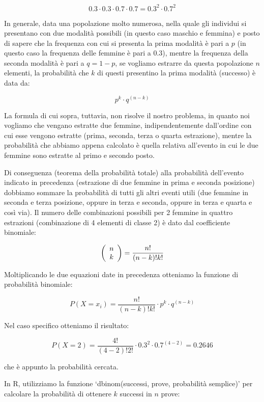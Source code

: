 \documentclass[a4paper,12pt,oneside]{book}
\theoremstyle{definition}
\theoremstyle{definition}
\theoremstyle{definition}
\theoremstyle{remark}
\begin{document}
\[0.3 \cdot 0.3 \cdot 0.7 \cdot 0.7 = 0.3^2 \cdot 0.7^2\]

In generale, data una popolazione molto numerosa, nella quale gli
individui si presentano con due modalità possibili (in questo caso
maschio e femmina) e posto di sapere che la frequenza con cui si
presenta la prima modalità è pari a \(p\) (in questo caso la frequenza
delle femmine è pari a 0.3), mentre la frequenza della seconda modalità
è pari a \(q = 1 - p\), se vogliamo estrarre da questa popolazione \(n\)
elementi, la probabilità che \(k\) di questi presentino la prima
modalità (successo) è data da:

\[p^k \cdot q^{(n-k)}\]

La formula di cui sopra, tuttavia, non risolve il nostro problema, in
quanto noi vogliamo che vengano estratte due femmine, indipendentemente
dall'ordine con cui esse vengono estratte (prima, seconda, terza o
quarta estrazione), mentre la probabilità che abbiamo appena calcolato è
quella relativa all'evento in cui le due femmine sono estratte al primo
e secondo posto.

Di conseguenza (teorema della probabilità totale) alla probabilità
dell'evento indicato in precedenza (estrazione di due femmine in prima e
seconda posizione) dobbiamo sommare la probabilità di tutti gli altri
eventi utili (due femmine in seconda e terza posizione, oppure in terza
e seconda, oppure in terza e quarta e così via). Il numero delle
combinazioni possibili per 2 femmine in quattro estrazioni (combinazione
di 4 elementi di classe 2) è dato dal coefficiente binomiale:

\[\left( {\begin{array}{*{20}c}
n  \\
k  \\
\end{array}} \right) = \frac{n!}{(n - k)!k!} \]

Moltiplicando le due equazioni date in precedenza otteniamo la funzione
di probabilità binomiale:

\[P(X = x_i ) = \frac{{n!}}{{(n - k)!k!}} \cdot p^k \cdot q^{(n - k)} \]

Nel caso specifico otteniamo il risultato:

\[P(X = 2) = \frac{4!}{(4 - 2)!2!} \cdot 0.3^2 \cdot 0.7^{(4 - 2)}  = 0.2646 \]

che è appunto la probabilità cercata.

In R, utilizziamo la funzione `dbinom(successi, prove, probabilità
semplice)' per calcolare la probabilità di ottenere \(k\) successi in
\(n\) prove:
\end{document}
